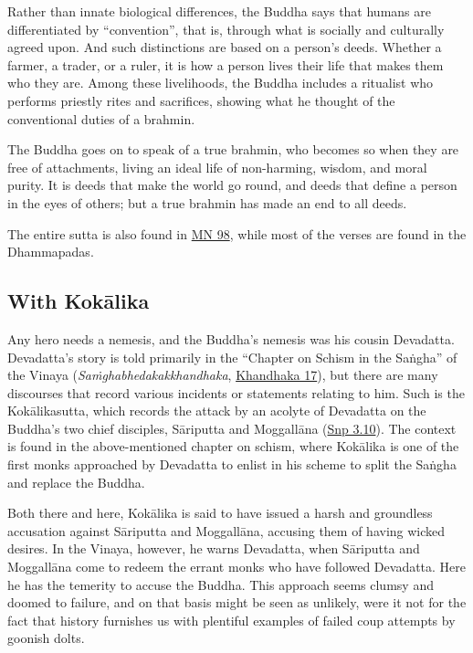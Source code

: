 \documentclass[12pt,openany]{book}%
\begin{document}
Rather than innate biological differences, the Buddha says that humans are differentiated by “convention”, that is, through what is socially and culturally agreed upon. And such distinctions are based on a person’s deeds. Whether a farmer, a trader, or a ruler, it is how a person lives their life that makes them who they are. Among these livelihoods, the Buddha includes a ritualist who performs priestly rites and sacrifices, showing what he thought of the conventional duties of a brahmin.

The Buddha goes on to speak of a true brahmin, who becomes so when they are free of attachments, living an ideal life of non-harming, wisdom, and moral purity. It is deeds that make the world go round, and deeds that define a person in the eyes of others; but a true brahmin has made an end to all deeds.

The entire sutta is also found in \href{https://suttacentral.net/mn98/en/sujato}{MN 98}, while most of the verses are found in the Dhammapadas.

\subsection*{With \textsanskrit{Kokālika}}

Any hero needs a nemesis, and the Buddha’s nemesis was his cousin Devadatta. Devadatta’s story is told primarily in the “Chapter on Schism in the \textsanskrit{Saṅgha}” of the Vinaya (\textit{\textsanskrit{Saṁghabhedakakkhandhaka}}, \href{https://suttacentral.net/kd17/en/brahmali}{Khandhaka 17}), but there are many discourses that record various incidents or statements relating to him. Such is the \textsanskrit{Kokālikasutta}, which records the attack by an acolyte of Devadatta on the Buddha’s two chief disciples, \textsanskrit{Sāriputta} and \textsanskrit{Moggallāna} (\href{https://suttacentral.net/snp3.10/en/sujato}{Snp 3.10}). The context is found in the above-mentioned chapter on schism, where \textsanskrit{Kokālika} is one of the first monks approached by Devadatta to enlist in his scheme to split the \textsanskrit{Saṅgha} and replace the Buddha.

Both there and here, \textsanskrit{Kokālika} is said to have issued a harsh and groundless accusation against \textsanskrit{Sāriputta} and \textsanskrit{Moggallāna}, accusing them of having wicked desires. In the Vinaya, however, he warns Devadatta, when \textsanskrit{Sāriputta} and \textsanskrit{Moggallāna} come to redeem the errant monks who have followed Devadatta. Here he has the temerity to accuse the Buddha. This approach seems clumsy and doomed to failure, and on that basis might be seen as unlikely, were it not for the fact that history furnishes us with plentiful examples of failed coup attempts by goonish dolts.
\end{document}
